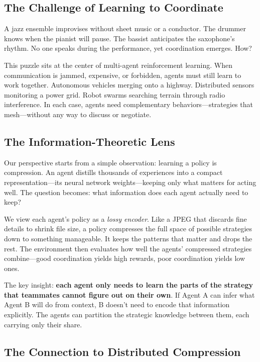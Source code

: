 \documentclass[10pt, letterpaper]{article}
\begin{document}
\subsection*{The Challenge of Learning to Coordinate}

A jazz ensemble improvises without sheet music or a conductor. The drummer knows when the pianist will pause. The bassist anticipates the saxophone's rhythm. No one speaks during the performance, yet coordination emerges. How?

This puzzle sits at the center of multi-agent reinforcement learning. When communication is jammed, expensive, or forbidden, agents must still learn to work together. Autonomous vehicles merging onto a highway. Distributed sensors monitoring a power grid. Robot swarms searching terrain through radio interference. In each case, agents need complementary behaviors---strategies that mesh---without any way to discuss or negotiate.

\subsection*{The Information-Theoretic Lens}

Our perspective starts from a simple observation: learning a policy is compression. An agent distills thousands of experiences into a compact representation---its neural network weights---keeping only what matters for acting well. The question becomes: what information does each agent actually need to keep?

We view each agent's policy as a \emph{lossy encoder}. Like a JPEG that discards fine details to shrink file size, a policy compresses the full space of possible strategies down to something manageable. It keeps the patterns that matter and drops the rest. The environment then evaluates how well the agents' compressed strategies combine---good coordination yields high rewards, poor coordination yields low ones.

The key insight: \textbf{each agent only needs to learn the parts of the strategy that teammates cannot figure out on their own}. If Agent A can infer what Agent B will do from context, B doesn't need to encode that information explicitly. The agents can partition the strategic knowledge between them, each carrying only their share.

\subsection*{The Connection to Distributed Compression}
\end{document}
